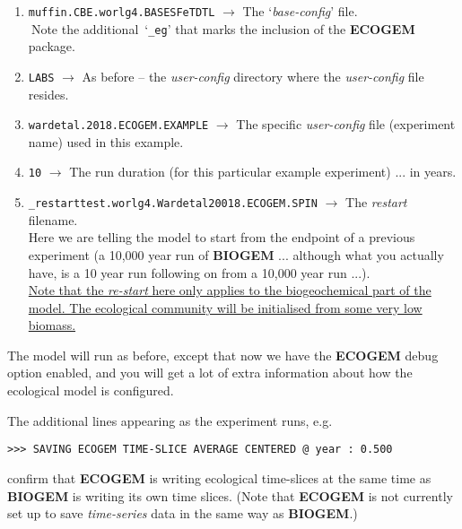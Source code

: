 \documentclass[11pt,fleqn]{book} %
\begin{document}
\begin{enumerate}[noitemsep]
\vspace{1mm}
\item \texttt{muffin.CBE.worlg4.BASESFeTDTL} $\rightarrow$ The `\textit{base-config}' file. \\
$~$\hfill Note the additional~`\texttt{\_eg}' that marks the inclusion of the \textbf{ECOGEM} package.
\vspace{1mm}
\item \texttt{LABS} $\rightarrow$ As before -- the \textit{user-config} directory where the \textit{user-config} file resides.
\vspace{1mm}
\item \texttt{wardetal.2018.ECOGEM.EXAMPLE} $\rightarrow$ The  specific \textit{user-config} file (experiment name) used in this example.
\vspace{1mm}
\item \texttt{10} $\rightarrow$ The run duration (for this particular example experiment) ... in years.
\vspace{1mm}
\item \texttt{\_restarttest.worlg4.Wardetal20018.ECOGEM.SPIN} $\rightarrow$ The \textit{restart} filename.
\\Here we are telling the model to start from the endpoint of a previous experiment (a 10,000 year run of \textbf{BIOGEM} ... although what you actually have, is a 10 year run following on from a 10,000 year run ...). 
\\\uline{Note that the \textit{re-start} here only applies to the biogeochemical part of the model. The ecological community will be initialised from some very low biomass.}
\end{enumerate}
\vspace{2mm}

The model will run as before, except that now we have the \textbf{ECOGEM} debug option enabled, and you will get a lot of extra information about how the ecological model is configured.
\vspace{1mm}

The additional lines appearing as the experiment runs, e.g.
\vspace{-1mm}\small\begin{verbatim}
>>> SAVING ECOGEM TIME-SLICE AVERAGE CENTERED @ year : 0.500
\end{verbatim}\normalsize\vspace{-1mm}
confirm that \textbf{ECOGEM} is writing ecological time-slices at the same time as \textbf{BIOGEM} is writing its own time slices. (Note that \textbf{ECOGEM} is not currently set up to save \textit{time-series} data in the same way as \textbf{BIOGEM}.)
\end{document}
